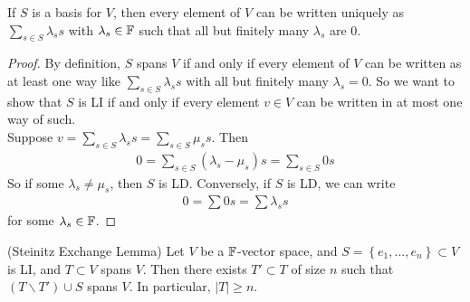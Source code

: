 \documentclass[a4paper]{article}
\begin{document}
\begin{prop}
If $S$ is a basis for $V$, then every element of $V$ can be written uniquely as $\sum_{s\in S} \lambda_s s$ with $\lambda_s \in \mathbb{F}$ such that all but finitely many $\lambda_s$ are 0.
\begin{proof}
By definition, $S$ spans $V$ if and only if every element of $V$ can be written as at least one way like $\sum_{s\in S} \lambda_s s$ with all but finitely many $\lambda_s=0$. So we want to show that $S$ is LI if and only if every element $v \in V$ can be written in at most one way of such.\\
Suppose $v=\sum_{s\in S} \lambda_s s = \sum_{s\in S} \mu_s s$. Then
\begin{equation*}
\begin{aligned}
0 = \sum_{s \in S} \left(\lambda_s - \mu_s\right) s = \sum_{s \in S} 0 s
\end{aligned}
\end{equation*}
So if some $\lambda_s \neq \mu_s$, then $S$ is LD. Conversely, if $S$ is LD, we can write
\begin{equation*}
\begin{aligned}
0 = \sum 0 s = \sum \lambda_s s
\end{aligned}
\end{equation*}
for some $\lambda_s \in \mathbb{F}$.
\end{proof}
\end{prop}

\begin{thm} (Steinitz Exchange Lemma) Let $V$ be a $\mathbb{F}$-vector space, and $S = \left\{ e_1,...,e_n\right\} \subset V$ is LI, and $T\subset V$ spans $V$. Then there exists $T' \subset T$ of size $n$ such that $\left(T\backslash T'\right) \cup S$ spans $V$. In particular, $|T| \geq n$.
\end{thm}
\end{document}
